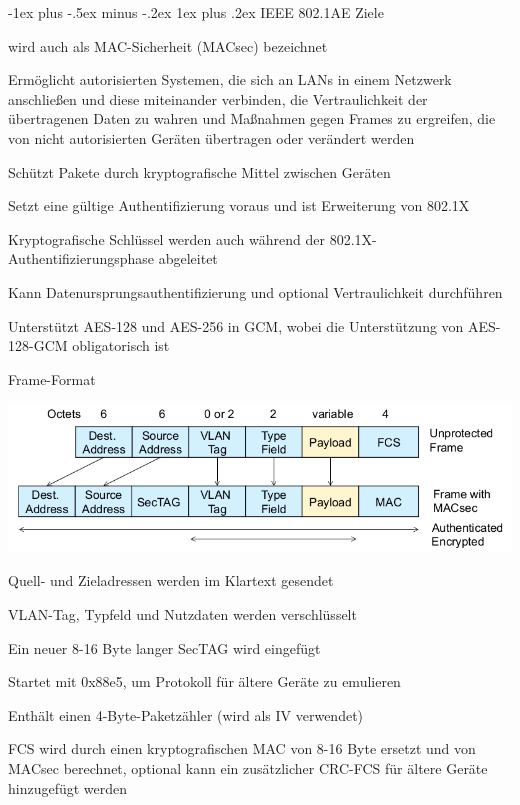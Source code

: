 \documentclass[a4paper]{article}
\makeatletter
\renewcommand{\subsubsection}{\@startsection{subsubsection}{3}{0mm}%
 {-1ex plus -.5ex minus -.2ex}%
 {1ex plus .2ex}%
 {\normalfont\small\bfseries}}
\makeatother
\begin{document}
\begin{multicols}{3}
      \subsubsection{IEEE 802.1AE}
      Ziele
      \begin{itemize*}
            \item wird auch als MAC-Sicherheit (MACsec) bezeichnet
            \item Ermöglicht autorisierten Systemen, die sich an LANs in einem Netzwerk anschließen und diese miteinander verbinden, die Vertraulichkeit der übertragenen Daten zu wahren und Maßnahmen gegen Frames zu ergreifen, die von nicht autorisierten Geräten übertragen oder verändert werden
            \item Schützt Pakete durch kryptografische Mittel zwischen Geräten%
            \item Setzt eine gültige Authentifizierung voraus und ist Erweiterung von 802.1X
            \item Kryptografische Schlüssel werden auch während der 802.1X-Authentifizierungsphase abgeleitet
            \item Kann Datenursprungsauthentifizierung und optional Vertraulichkeit durchführen
            \item Unterstützt AES-128 und AES-256 in GCM, wobei die Unterstützung von AES-128-GCM obligatorisch ist
      \end{itemize*}

      Frame-Format
      \begin{itemize*}
            \item \includegraphics[width=.8\linewidth]{Assets/NetworkSecurity-ieee802.1AE-frame.png}
            \item Quell- und Zieladressen werden im Klartext gesendet
            \item VLAN-Tag, Typfeld und Nutzdaten werden verschlüsselt
            \item Ein neuer 8-16 Byte langer SecTAG wird eingefügt
            \begin{itemize*}
                  \item Startet mit 0x88e5, um Protokoll für ältere Geräte zu emulieren
                  \item Enthält einen 4-Byte-Paketzähler (wird als IV verwendet)%
            \end{itemize*}
            \item FCS wird durch einen kryptografischen MAC von 8-16 Byte ersetzt und von MACsec berechnet, optional kann ein zusätzlicher CRC-FCS für ältere Geräte hinzugefügt werden
      \end{itemize*}


\end{multicols}
\end{document}
